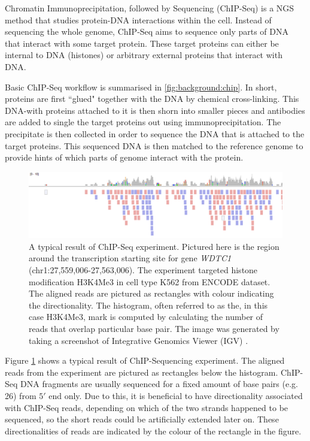 \documentclass[parskip]{cs4rep}
\newcommand{\histonemodification}[1]{#1}
\newcommand{\celltype}[1]{#1}
\begin{document}
Chromatin Immunoprecipitation, followed by Sequencing (ChIP-Seq) is a NGS method that studies protein-DNA interactions within the cell. Instead of sequencing the whole genome, ChIP-Seq aims to sequence only parts of DNA that interact with some target protein. These target proteins can either be internal to DNA (histones) or arbitrary external proteins that interact with DNA.

Basic ChIP-Seq workflow is summarised in \autoref{fig:background:chip}. In short, proteins are first ``glued" together with the DNA by chemical cross-linking. This DNA-with proteins attached to it is then shorn into smaller pieces and antibodies are added to single the target proteins out using immunoprecipitation. The precipitate is then collected in order to sequence the DNA that is attached to the target proteins\cite{Mardis:2007wa}. This sequenced DNA is then matched to the reference genome to provide hints of which parts of genome interact with the protein.

\begin{figure}[t]
    \centering
    \includegraphics[width=\textwidth]{figures/background/igv_panel_screenshot_k562_h3k4me3_WDTC1-transparentbcg.png}
    \caption{A typical result of ChIP-Seq experiment. Pictured here is the region around the transcription starting site for gene \emph{WDTC1} (chr1:27,559,006-27,563,006). The experiment targeted histone modification \histonemodification{H3K4Me3} in cell type \celltype{K562} from ENCODE dataset. The aligned reads are pictured as rectangles with colour indicating the directionality. The histogram, often referred to as the, in this case \histonemodification{H3K4Me3}, mark is computed by calculating the number of reads that overlap particular base pair. The image was generated by taking a screenshot of Integrative Genomics Viewer (IGV) \cite{Thorvaldsdottir:2012wy}.}
    \label{fig:background:chip-results}
\end{figure}

Figure \ref{fig:background:chip-results} shows a typical result of ChIP-Sequencing experiment.
The aligned reads from the experiment are pictured as rectangles below the histogram. ChIP-Seq DNA fragments are usually sequenced for a fixed amount of base pairs (e.g. 26) from $5'$ end only\cite{Park:2009wc}. Due to this, it is beneficial to have directionality associated with ChIP-Seq
reads, depending on which of the two strands happened to be sequenced, so the short reads could be artificially extended later on. These directionalities of reads are indicated by the colour of the rectangle in the figure. 
\end{document}
